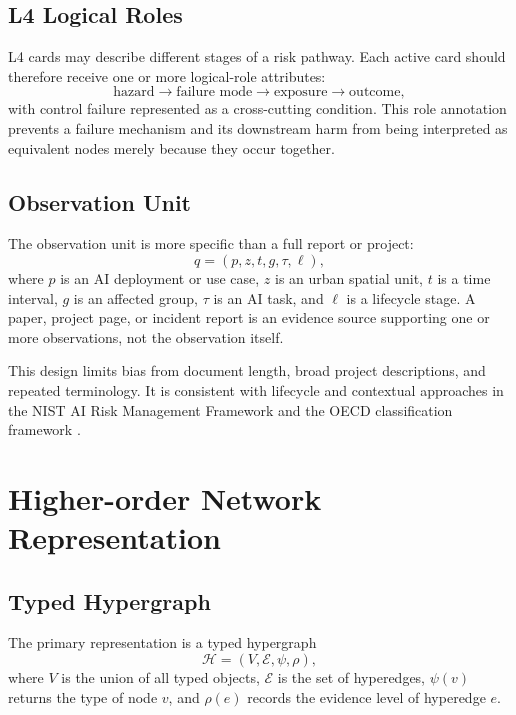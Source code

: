 \documentclass[11pt,a4paper]{article}
\begin{document}
\subsection{L4 Logical Roles}

L4 cards may describe different stages of a risk pathway. Each active card should therefore receive one or more logical-role attributes:
\begin{equation}
\text{hazard}
\rightarrow
\text{failure mode}
\rightarrow
\text{exposure}
\rightarrow
\text{outcome},
\end{equation}
with control failure represented as a cross-cutting condition. This role annotation prevents a failure mechanism and its downstream harm from being interpreted as equivalent nodes merely because they occur together.

\subsection{Observation Unit}

The observation unit is more specific than a full report or project:
\begin{equation}
q =
\left(
p,z,t,g,\tau,\ell
\right),
\end{equation}
where $p$ is an AI deployment or use case, $z$ is an urban spatial unit, $t$ is a time interval, $g$ is an affected group, $\tau$ is an AI task, and $\ell$ is a lifecycle stage. A paper, project page, or incident report is an evidence source supporting one or more observations, not the observation itself.

This design limits bias from document length, broad project descriptions, and repeated terminology. It is consistent with lifecycle and contextual approaches in the NIST AI Risk Management Framework and the OECD classification framework \cite{nist2023,oecd2022}.

\section{Higher-order Network Representation}

\subsection{Typed Hypergraph}

The primary representation is a typed hypergraph
\begin{equation}
\mathcal{H} =
\left(
V,\mathcal{E},\psi,\rho
\right),
\end{equation}
where $V$ is the union of all typed objects, $\mathcal{E}$ is the set of hyperedges, $\psi(v)$ returns the type of node $v$, and $\rho(e)$ records the evidence level of hyperedge $e$.
\end{document}
